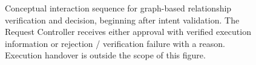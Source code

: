 \documentclass[a4paper]{article}
\begin{document}
\begin{figure}[htbp]
\centering

\caption{Conceptual interaction sequence for graph-based relationship
verification and decision, beginning after intent validation. The Request
Controller receives either approval with verified execution information or
rejection / verification failure with a reason. Execution handover is outside
the scope of this figure.}
\label{fig:verification-sequence}
\end{figure}
\end{document}
